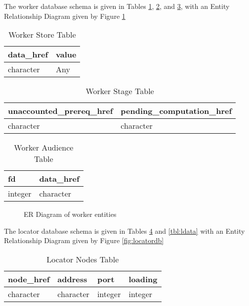 The worker database schema is given in Tables \ref{tbl:wstore}, \ref{tbl:wstage}, and \ref{tbl:waudience}, with an Entity Relationship Diagram given by Figure \ref{fig:workerdb}

\begin{table}[]
\caption{Worker Store Table}
\label{tbl:wstore}
\begin{tabular}{@{}ll@{}}
\toprule
data\_href & value \\ \midrule
character  & Any   \\ \bottomrule
\end{tabular}
\end{table}

\begin{table}[]
\caption{Worker Stage Table}
\label{tbl:wstage}
\begin{tabular}{@{}ll@{}}
\toprule
unaccounted\_prereq\_href & pending\_computation\_href \\ \midrule
character                 & character                  \\ \bottomrule
\end{tabular}
\end{table}

\begin{table}[]
\caption{Worker Audience Table}
\label{tbl:waudience}
\begin{tabular}{@{}ll@{}}
\toprule
fd      & data\_href \\ \midrule
integer & character  \\ \bottomrule
\end{tabular}
\end{table}


\begin{figure}

\caption{ER Diagram of worker entities}
\label{fig:workerdb}
\end{figure}

The locator database schema is given in Tables \ref{tbl:lnodes} and \ref{tbl:ldata} with an Entity Relationship Diagram given by Figure \ref{fig:locatordb}


\begin{table}[]
\caption{Locator Nodes Table}
\label{tbl:lnodes}
\begin{tabular}{@{}llll@{}}
\toprule
node\_href & address   & port    & loading \\ \midrule
character  & character & integer & integer \\ \bottomrule
\end{tabular}
\end{table}

